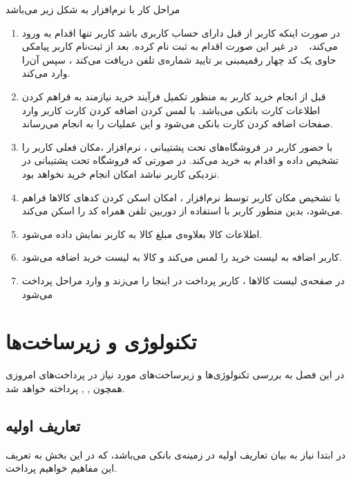 \documentclass[oneside]{report}
\begin{document}
مراحل کار با نرم‌افزار به شکل زیر می‌باشد
\begin{enumerate}
	\item در صورت اینکه کاربر از قبل دارای حساب کاربری باشد کاربر تنها اقدام به ورود می‌کند،
	در غیر این صورت اقدام به ثبت نام کرده. بعد از ثبت‌نام کاربر پیامکی حاوی یک کد چهار رقمیمبنی  بر تایید شماره‌ی تلفن دریافت می‌کند ، سپس آن‌را وارد می‌کند.
	\item قبل از انجام خرید کاربر به منظور تکمیل فرآیند خرید نیازمند به فراهم کردن اطلاعات کارت بانکی می‌باشد. با لمس کردن اضافه کردن کارت کاربر وارد صفحات اضافه کردن کارت بانکی می‌شود و این عملیات را به انجام می‌رساند.
	\item با حضور کاربر در فروشگاه‌های تحت پشتیبانی ، نرم‌افزار ،مکان فعلی کاربر را تشخیص داده و اقدام به خرید می‌کند. در صورتی که فروشگاه تحت پشتیبانی در نزدیکی کاربر نباشد امکان انجام خرید نخواهد بود.
	\item با تشخیص مکان کاربر توسط نرم‌افزار ، امکان اسکن کردن کد‌های کالاها فراهم می‌شود، بدین منطور کاربر با استفاده از دوربین تلفن همراه کد
	   		     		 {\normalsize{}}
	  			 				 را اسکن می‌کند.
	\item اطلاعات کالا بعلاوه‌ی مبلغ کالا به کاربر نمایش داده می‌شود.
	\item کاربر اضافه به لیست خرید را لمس می‌کند و کالا به لیست خرید اضافه می‌شود.
	\item در صفحه‌ی لیست کالاها ، کاربر پرداخت در اینجا را می‌زند و وارد مراحل پرداخت می‌شود
\end{enumerate}
		   
		
		\chapter{تکنولوژی {\Large{}} و زیرساخت‌ها }\label{tokenisation}
	در این فصل به بررسی تکنولوژی‌ها و زیرساخت‌های  مورد نیاز در پرداخت‌های امروزی همچون 
	   		 {\normalsize{}} , 
	    		 {\normalsize{}} , 
	    		    		 {\normalsize{}} 
	پرداخته خواهد شد.
	
	\noindent

		
	\section{تعاریف اولیه}\label{definitions}
			در ابتدا نیاز به بیان تعاریف اولیه‌ در زمینه‌ی بانکی می‌باشد، که در این بخش به تعریف این مفاهیم خواهیم پرداخت. 
\end{document}
